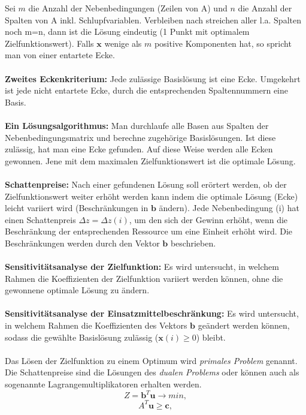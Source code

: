 		Sei $ m $ die Anzahl der Nebenbedingungen (Zeilen von A) und $ n $ die Anzahl der Spalten von A inkl. Schlupfvariablen. Verbleiben nach streichen aller l.a. Spalten noch m=n, dann ist die Lösung eindeutig (1 Punkt mit optimalem Zielfunktionswert). Falls $ \bm{x} $ wenige als $ m $ positive Komponenten hat, so spricht man von einer entartete Ecke.
		\leavevmode \\\\
		\textbf{Zweites Eckenkriterium:} Jede zulässige Basislösung ist eine Ecke. Umgekehrt ist jede nicht entartete Ecke, durch die entsprechenden Spaltennummern eine Basis.
		\leavevmode \\\\
		\textbf{Ein Lösungsalgorithmus:} Man durchlaufe alle Basen aus Spalten der Nebenbedingungsmatrix und berechne zugehörige Basislösungen. Ist diese zulässig, hat man eine Ecke gefunden. Auf diese Weise werden alle Ecken gewonnen. Jene mit dem maximalen Zielfunktionswert ist die optimale Lösung.
		\leavevmode \\\\
		\textbf{Schattenpreise:} Nach einer gefundenen Lösung soll erörtert werden, ob der Zielfunktionswert weiter erhöht werden kann indem die optimale Lösung (Ecke) leicht variiert wird (Beschränkungen in $ \bm{b} $ ändern). Jede Nebenbedingung (i) hat einen Schattenpreis $ \Delta z = \Delta z(i) $, um den sich der Gewinn erhöht, wenn die Beschränkung der entsprechenden Ressource um eine Einheit erhöht wird. Die Beschränkungen werden durch den Vektor $ \bm{b} $ beschrieben.
		\leavevmode \\\\
		\textbf{Sensitivitätsanalyse der Zielfunktion:} Es wird untersucht, in welchem Rahmen die Koeffizienten der Zielfunktion variiert werden können, ohne die gewonnene optimale Lösung zu ändern.
		\leavevmode \\\\
		\textbf{Sensitivitätsanalyse der Einsatzmittelbeschränkung:} Es wird untersucht, in welchem Rahmen die Koeffizienten des Vektors $ \bm{b} $ geändert werden können, sodass die gewählte Basislösung zulässig ($ \bm{x}(i) \geq 0 $) bleibt.
		\leavevmode \\\\
		Das Lösen der Zielfunktion zu einem Optimum wird \textit{primales Problem} genannt. Die Schattenpreise sind die Lösungen des \textit{dualen Problems} oder können auch als sogenannte Lagrangemultiplikatoren erhalten werden.
		\[Z = \bm{b}^{T}\bm{u}\rightarrow min,\]
		\[A^{T}\bm{u} \geq \bm{c},\]
